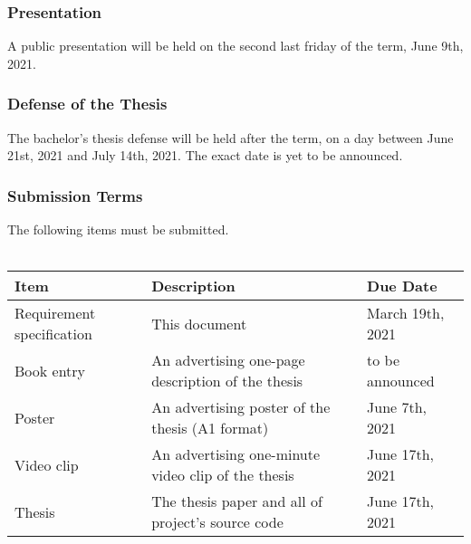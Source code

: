 \subsubsection{Presentation}
A public presentation will be held on the second last friday of the term, June 9th, 2021.

\subsubsection{Defense of the Thesis}
The bachelor's thesis defense will be held after the term, on a day between June 21st, 2021 and July 14th, 2021. The exact date is yet to be announced. 

\subsubsection{Submission Terms}
The following items must be submitted.
\\\\
\noindent
\begin{tabular}{|l|l|l|}
    \hline
    \textbf{Item}               & \textbf{Description}                               & \textbf{Due Date}     \\ \hline
    Requirement specification   & This document                                      & March 19th, 2021      \\ \hline
    Book entry                  & An advertising one-page description of the thesis  & to be announced       \\ \hline
    Poster                      & An advertising poster of the thesis (A1 format)    & June 7th, 2021        \\ \hline
    Video clip                  & An advertising one-minute video clip of the thesis & June 17th, 2021       \\ \hline
    Thesis                      & The thesis paper and all of project's source code  & June 17th, 2021       \\ \hline
\end{tabular}
\newline
\noindent